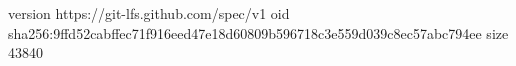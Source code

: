 version https://git-lfs.github.com/spec/v1
oid sha256:9ffd52cabffec71f916eed47e18d60809b596718c3e559d039c8ec57abc794ee
size 43840
